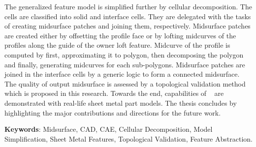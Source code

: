 The generalized feature model is simplified further by cellular decomposition. The cells are classified into solid and interface cells. They are delegated with the tasks of creating midsurface patches and joining them, respectively. Midsurface patches are created either by offsetting the profile face or by lofting midcurves of the profiles along the guide of the owner loft feature. Midcurve of the profile is computed by first, approximating it to polygon, then decomposing the polygon and finally, generating midcurves for each sub-polygons. Midsurface patches are joined in the interface cells by a generic logic to form a connected midsurface. The quality of output midsurface is assessed by a topological validation method which is proposed in this research. Towards the end, capabilities of \mysystemname~ are demonstrated with real-life sheet metal part models. The thesis concludes by highlighting the major contributions and directions for the future work.



\bigskip

{\bf Keywords}:  Midsurface, CAD, CAE, Cellular Decomposition, Model Simplification, Sheet Metal Features, Topological Validation, Feature Abstraction.
